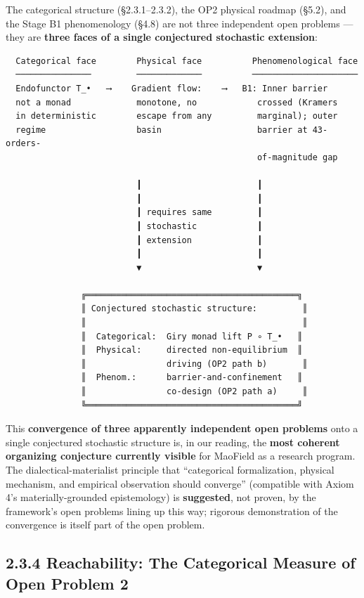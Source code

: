 \documentclass[
]{article}
\begin{document}
The categorical structure (§2.3.1--2.3.2), the OP2 physical roadmap
(§5.2), and the Stage B1 phenomenology (§4.8) are not three independent
open problems --- they are \textbf{three faces of a single conjectured
stochastic extension}:

\begin{verbatim}
  Categorical face        Physical face          Phenomenological face
  ───────────────         ─────────────          ─────────────────────
  Endofunctor T_•   ⟶    Gradient flow:    ⟶   B1: Inner barrier 
  not a monad             monotone, no            crossed (Kramers
  in deterministic        escape from any         marginal); outer
  regime                  basin                   barrier at 43-orders-
                                                  of-magnitude gap
                                                  
                          ┃                       ┃
                          ┃                       ┃
                          ┃ requires same         ┃
                          ┃ stochastic            ┃
                          ┃ extension             ┃
                          ┃                       ┃
                          ▼                       ▼

               ╔══════════════════════════════════════════╗
               ║ Conjectured stochastic structure:         ║
               ║                                           ║
               ║  Categorical:  Giry monad lift P ∘ T_•   ║
               ║  Physical:     directed non-equilibrium  ║
               ║                driving (OP2 path b)       ║
               ║  Phenom.:      barrier-and-confinement   ║
               ║                co-design (OP2 path a)     ║
               ╚══════════════════════════════════════════╝
\end{verbatim}

This \textbf{convergence of three apparently independent open problems}
onto a single conjectured stochastic structure is, in our reading, the
\textbf{most coherent organizing conjecture currently visible} for
MaoField as a research program. The dialectical-materialist principle
that ``categorical formalization, physical mechanism, and empirical
observation should converge'' (compatible with Axiom 4's
materially-grounded epistemology) is \textbf{suggested}, not proven, by
the framework's open problems lining up this way; rigorous demonstration
of the convergence is itself part of the open problem.

\hypertarget{reachability-the-categorical-measure-of-open-problem-2}{%
\subsection{2.3.4 Reachability: The Categorical Measure of Open Problem
2}\label{reachability-the-categorical-measure-of-open-problem-2}}
\end{document}
